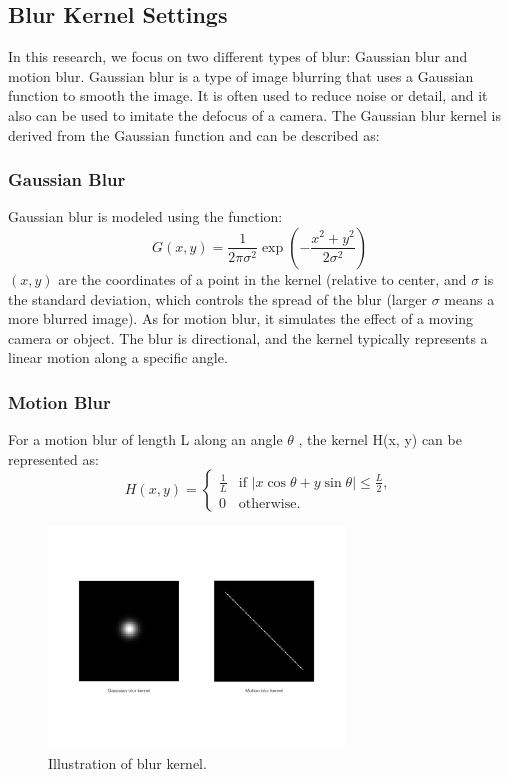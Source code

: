 \documentclass[twoside,11pt]{article}
\begin{document}
\subsection{Blur Kernel Settings}
In this research, we focus on two different types of blur: Gaussian blur and motion blur.
Gaussian blur is a type of image blurring that uses a Gaussian function to smooth the image. It is often used to reduce noise or detail, and it also can be used to imitate the defocus of a camera.
The Gaussian blur kernel is derived from the Gaussian function and can be described as:

\subsubsection{Gaussian Blur}
Gaussian blur is modeled using the function:
\[
G(x, y) = \frac{1}{2\pi\sigma^2} \exp\left(-\frac{x^2 + y^2}{2\sigma^2}\right)
\]
 \( (x, y) \) are the coordinates of a point in the kernel (relative to center, and \( \sigma \) is the standard deviation, which controls the spread of the blur (larger  \( \sigma \) means a more blurred image).
As for motion blur, it simulates the effect of a moving camera or object. The blur is directional, and the kernel typically represents a linear motion along a specific angle.

\subsubsection{Motion Blur}
For a motion blur of length  L  along an angle \(\theta\) , the kernel  H(x, y)  can be represented as:
\[
H(x, y) =
\begin{cases}
\frac{1}{L} & \text{if } |x \cos \theta + y \sin \theta| \leq \frac{L}{2}, \\
0 & \text{otherwise}.
\end{cases}
\]

\begin{figure}[H]
\centering
\includegraphics[width=0.7\textwidth]{figure5.jpg}
\caption{Illustration of blur kernel.}
\end{figure}
\end{document}
